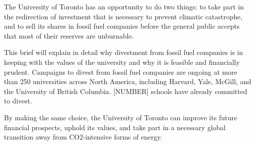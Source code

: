 The University of Toronto has an opportunity to do two things: to take part in the redirection of investment that is necessary to prevent climatic catastrophe, and to sell its shares in fossil fuel companies before the general public accepts that most of their reserves are unburnable.



This brief will explain in detail why divestment from fossil fuel companies is in keeping with the values of the university and why it is feasible and financially prudent.
Campaigns to divest from fossil fuel companies are ongoing at more than 250 universities across North America, including Harvard, Yale, McGill, and the University of British Columbia.
[NUMBER] schools have already committed to divest.



By making the same choice, the University of Toronto can improve its future financial prospects, uphold its values, and take part in a necessary global transition away from CO2-intensive forms of energy.



